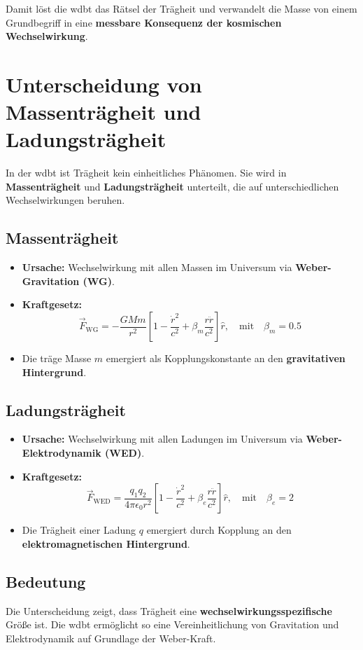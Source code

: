 Damit löst die \gls{wdbt} das Rätsel der Trägheit und verwandelt die Masse von einem Grundbegriff in eine \textbf{messbare Konsequenz der kosmischen Wechselwirkung}.

\section{Unterscheidung von Massenträgheit und Ladungsträgheit}

In der \gls{wdbt} ist Trägheit kein einheitliches Phänomen. Sie wird in \textbf{Massenträgheit} und \textbf{Ladungsträgheit} unterteilt, die auf unterschiedlichen Wechselwirkungen beruhen.

\subsection{Massenträgheit}
\begin{itemize}
    \item \textbf{Ursache:} Wechselwirkung mit allen Massen im Universum via \textbf{Weber-Gravitation (WG)}.
    \item \textbf{Kraftgesetz:}
        \[
        \vec{F}_{\text{WG}} = -\frac{G M m}{r^2} \left[ 1 - \frac{\dot{r}^2}{c^2} + \beta_m \frac{r \ddot{r}}{c^2} \right] \hat{r}, \quad \text{mit} \quad \beta_m = 0.5
        \]
    \item Die träge Masse $m$ emergiert als Kopplungskonstante an den \textbf{gravitativen Hintergrund}.
\end{itemize}

\subsection{Ladungsträgheit}
\begin{itemize}
    \item \textbf{Ursache:} Wechselwirkung mit allen Ladungen im Universum via \textbf{Weber-Elektrodynamik (WED)}.
    \item \textbf{Kraftgesetz:}
        \[
        \vec{F}_{\text{WED}} = \frac{q_1 q_2}{4\pi\epsilon_0 r^2} \left[ 1 - \frac{\dot{r}^2}{c^2} + \beta_e \frac{r \ddot{r}}{c^2} \right] \hat{r}, \quad \text{mit} \quad \beta_e = 2
        \]
    \item Die Trägheit einer Ladung $q$ emergiert durch Kopplung an den \textbf{elektromagnetischen Hintergrund}.
\end{itemize}

\subsection{Bedeutung}
Die Unterscheidung zeigt, dass Trägheit eine \textbf{wechselwirkungsspezifische} Größe ist. Die \gls{wdbt} ermöglicht so eine Vereinheitlichung von Gravitation und Elektrodynamik auf Grundlage der
Weber-Kraft.
